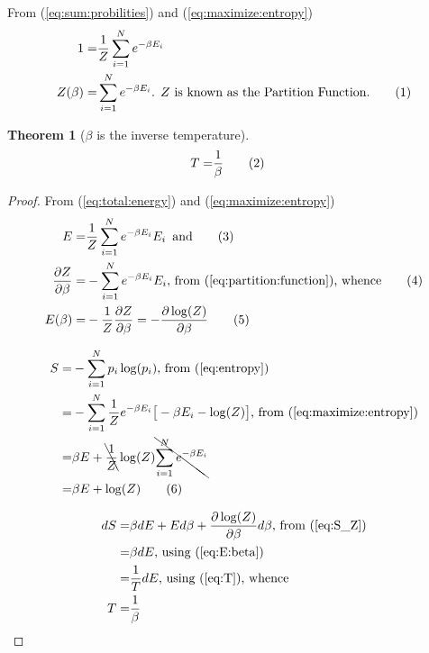 \documentclass[]{article}
\newcommand\numberthis{\addtocounter{equation}{1}\tag{\theequation}}
\newtheorem{thm}{Theorem}
\begin{document}
From (\ref{eq:sum:probilities}) and (\ref{eq:maximize:entropy})
\begin{align*}
1 =& \frac{1}{Z}  \sum_{i=1}^{N} e^{-\beta E_i}\\
Z(\beta) =& \sum_{i=1}^{N} e^{-\beta E_i} \text{. $Z$ is known as the Partition Function.} \numberthis \label{eq:partition:function}
\end{align*}

\begin{thm}[$\beta$ is the inverse temperature]\label{thm:inverseT}
	\begin{align*}
		T =& \frac{1}{\beta}\numberthis\label{eq:inverseT}
	\end{align*}
\end{thm}

\begin{proof}
	From (\ref{eq:total:energy}) and (\ref{eq:maximize:entropy})
	\begin{align*}
	E =& \frac{1}{Z}  \sum_{i=1}^{N} e^{-\beta E_i} E_i \text{\, and}\numberthis \label{eq:E}\\
	\frac{\partial Z}{\partial \beta} =& - \sum_{i=1}^{N} e^{-\beta E_i} E_i \text{, from (\ref{eq:partition:function}), whence} \numberthis \label{eq:dZ}\\
	E(\beta) =& - \frac{1}{Z} \frac{\partial Z}{\partial \beta} = - \frac{\partial \log(Z)}{\partial \beta} \numberthis \label{eq:E:beta}
	\end{align*}
	
	\begin{align*}
	S =& -\sum_{i=1}^{N} p_i \log(p_i) \text{, from (\ref{eq:entropy})}\\
	=& - \sum_{i=1}^{N} \frac{1}{Z} e^{- \beta E_i}\big[- \beta E_i -\log(Z)\big]\text{, from (\ref{eq:maximize:entropy})}\\
	=& \beta E +  \bcancel{\frac{1}{Z}} \log(Z)  \bcancel{\sum_{i=1}^{N} e^{-\beta E_i}}\\
	=& \beta E +   \log(Z)  \numberthis \label{eq:S_Z}
	\end{align*}
	
	\begin{align*}
	dS =& \beta dE + E d\beta + \frac{\partial \log(Z)}{\partial \beta} d\beta \text{, from (\ref{eq:S_Z})}\\
	=& \beta dE \text{, using (\ref{eq:E:beta})}\\
	=& \frac{1}{T} dE \text{, using (\ref{eq:T})}\text{, whence}\\
	T =& \frac{1}{\beta}
	\end{align*}
\end{proof}
\end{document}

